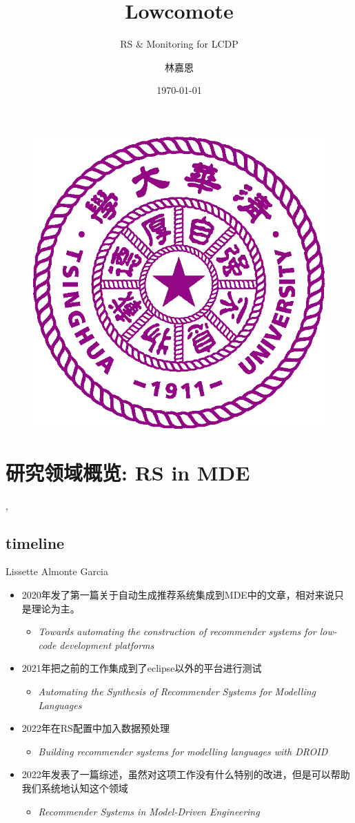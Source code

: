 \documentclass{beamer}
\author{林嘉恩}
\title{Lowcomote}
\subtitle{RS \& Monitoring for LCDP}
\institute{清华大学}
\date{\today}
\begin{document}
\kaishu
\begin{frame}
    \titlepage
    \begin{figure}[htpb]
        \begin{center}
            \includegraphics[width=0.2\linewidth]{pic/Tsinghua_University_Logo.eps}
        \end{center}
    \end{figure}
\end{frame}
\begin{frame}
    \tableofcontents[sectionstyle=show,subsectionstyle=show/shaded/hide,subsubsectionstyle=show/shaded/hide]
\end{frame}



\section{研究领域概览: RS in MDE},

\subsection{timeline}
\begin{frame}{Lissette Almonte Garcia}
    \begin{itemize}
        \item 2020年发了第一篇关于自动生成推荐系统集成到MDE中的文章，相对来说只是理论为主。
        \begin{itemize}
            \item \textit{Towards automating the construction of recommender systems for low-code development platforms} 
        \end{itemize}
        \item 2021年把之前的工作集成到了eclipse以外的平台进行测试
        \begin{itemize}
            \item \textit{Automating the Synthesis of Recommender Systems for Modelling Languages} 
        \end{itemize}
        \item 2022年在RS配置中加入数据预处理
        \begin{itemize}
            \item \textit{Building recommender systems for modelling languages with DROID} 
        \end{itemize}
        \item 2022年发表了一篇综述，虽然对这项工作没有什么特别的改进，但是可以帮助我们系统地认知这个领域
        \begin{itemize}
            \item \textit{Recommender Systems in Model-Driven Engineering} 
        \end{itemize}
    \end{itemize}
\end{frame}
\end{document}
